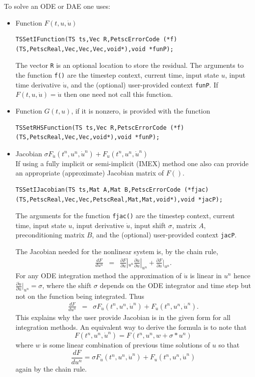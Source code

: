 To solve an ODE or DAE one uses:
\begin{itemize}
\item Function $F(t,u,\dot{u})$
\begin{lstlisting}
TSSetIFunction(TS ts,Vec R,PetscErrorCode (*f)(TS,PetscReal,Vec,Vec,Vec,void*),void *funP);
\end{lstlisting}
  The vector \lstinline{R} is an optional location to store the residual.
  The arguments to the function \lstinline{f()} are the
  timestep context, current time, input state $u$, input time derivative
  $\dot{u}$, and the (optional) user-provided context \lstinline{funP}. If    $F(t,u,\dot{u}) = \dot{u} $ then
  one need not call this function.

\item Function $ G(t,u)$, if it is nonzero, is provided with the function
\begin{lstlisting}
TSSetRHSFunction(TS ts,Vec R,PetscErrorCode (*f)(TS,PetscReal,Vec,Vec,void*),void *funP);
\end{lstlisting}

\item Jacobian $ \sigma F_{\dot{u}}(t^n,u^n,\dot{u}^n) + F_u(t^n,u^n,\dot{u}^n) $ \\
  If using a fully implicit or semi-implicit (IMEX) method one also can provide an appropriate (approximate) Jacobian matrix of $F()$.
\begin{lstlisting}
TSSetIJacobian(TS ts,Mat A,Mat B,PetscErrorCode (*fjac)(TS,PetscReal,Vec,Vec,PetscReal,Mat,Mat,void*),void *jacP);
\end{lstlisting}
  The arguments for the function \lstinline{fjac()}
  are the timestep context, current time, input state $u$, input
  derivative $\dot{u}$, input shift $\sigma$, matrix $A$, preconditioning matrix
  $B$, and the (optional) user-provided context \lstinline{jacP}.

  The Jacobian needed for the nonlinear system is, by the chain rule,
\begin{eqnarray*}
    \frac{d F}{d u^n} &  = &  \frac{\partial F}{\partial \dot{u}}|_{u^n} \frac{\partial \dot{u}}{\partial u}|_{u^n} + \frac{\partial F}{\partial u}|_{u^n}.
\end{eqnarray*}
For any ODE integration method the approximation of $ \dot{u} $ is linear in $ u^n$ hence $ \frac{\partial \dot{u}}{\partial u}|_{u^n} = \sigma $, where the shift $\sigma$ depends on the
ODE integrator and time step but not on the function being integrated. Thus
\begin{eqnarray*}
    \frac{d F}{d u^n} &  = &    \sigma F_{\dot{u}}(t^n,u^n,\dot{u}^n) + F_u(t^n,u^n,\dot{u}^n).
\end{eqnarray*}
This explains why the user provide Jacobian is in the given form for all integration methods. An equivalent way to derive the formula is to note that
\[
   F(t^n,u^n,\dot{u}^n) = F(t^n,u^n,w+\sigma*u^n)
\]
where $ w $ is some linear combination of previous time solutions of $u$ so that
\[
\frac{d F}{d u^n} = \sigma F_{\dot{u}}(t^n,u^n,\dot{u}^n) + F_u(t^n,u^n,\dot{u}^n)
\]
again by the chain rule.


\end{itemize}
